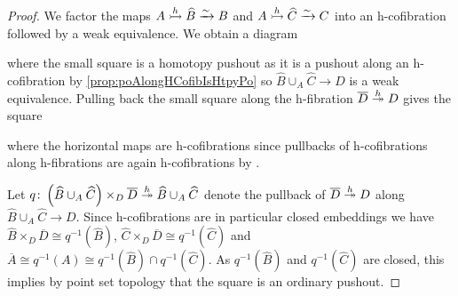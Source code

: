 \begin{prop}
\begin{proof}
        We factor the maps $A\xtailrightarrow{h}\widehat{B}\xrightarrow{\sim} B$ and $A\xtailrightarrow{h}\widehat{C}\xrightarrow{\sim} C$ into an h-cofibration followed by a weak equivalence.
        We obtain a diagram
        \begin{center}
        \end{center}
        where the small square is a homotopy pushout as it is a pushout along an h-cofibration by \cref{prop:poAlongHCofibIsHtpyPo} so $\widehat{B}\cup_A\widehat{C}\to D$ is a weak equivalence.
        Pulling back the small square along the h-fibration $\overline{D}\xtwoheadrightarrow{h} D$ gives the square
        \begin{center}
        \end{center}
        where the horizontal maps are h-cofibrations since pullbacks of h-cofibrations along h-fibrations are again h-cofibrations by \cite[Theorem 12]{note_on_cofibs_2}.
        
        Let $q\colon\left(\widehat{B}\cup_A\widehat{C}\right)\times_{D}\overline{D}\xtwoheadrightarrow{h}\widehat{B}\cup_A\widehat{C}$ denote the pullback of $\overline{D}\xtwoheadrightarrow{h} D$ along  $\widehat{B}\cup_A\widehat{C}\to D$.
        Since h-cofibrations are in particular closed embeddings we have $\widehat{B}\times_{D}\overline{D}\cong q^{-1}(\widehat{B})$, $\widehat{C}\times_{D}\overline{D}\cong q^{-1}(\widehat{C})$ and $\overline{A}\cong q^{-1}(A)\cong q^{-1}(\widehat{B})\cap q^{-1}(\widehat{C})$.
        As $q^{-1}(\widehat{B})$ and $q^{-1}(\widehat{C})$ are closed, this implies by point set topology that the square is an ordinary pushout.


\end{proof}
\end{prop}
